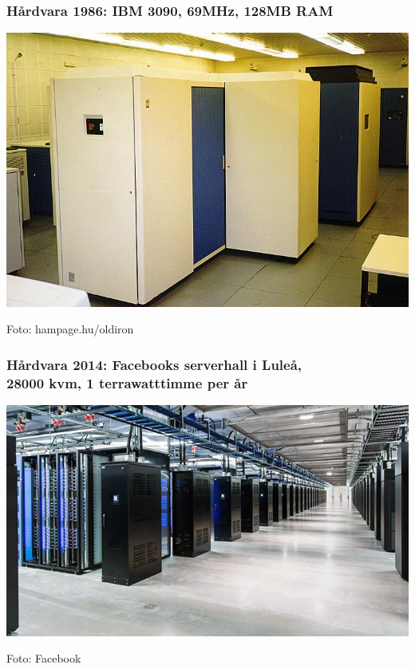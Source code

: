 \documentclass{lecturesimple}
\begin{document}
\begin{frame}\frametitle{Hårdvara 1986: IBM 3090, 69MHz, 128MB RAM}
\begin{center}
     \includegraphics[width=1.0\textwidth]{../img/ibm3090.jpg}
  
    {\fontsize{5}{5}\selectfont\color{gray}
    Foto: hampage.hu/oldiron
  }
\end{center}
\end{frame}
  
\begin{frame}\frametitle{Hårdvara 2014: Facebooks serverhall i Luleå, \\ 28000 kvm, 1 terrawatttimme per år}
  \begin{center}
    \includegraphics[width=1.05\textwidth]{../img/lulea-datacenter.jpg}
  
    {\fontsize{5}{5}\selectfont\color{gray}
  Foto: Facebook
  }
  \end{center}
\end{frame}
\end{document}
